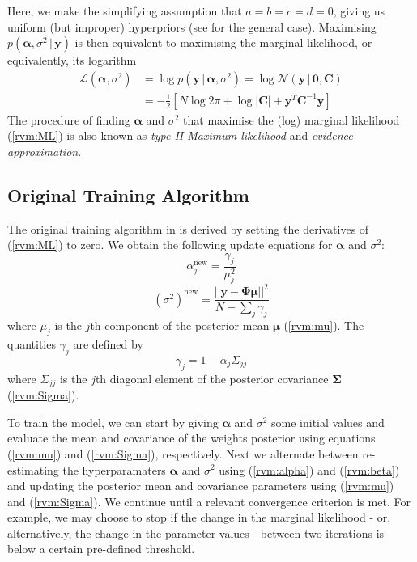 Here, we make the simplifying assumption that $a=b=c=d=0$, giving us uniform (but improper) hyperpriors (see \cite{tipping2001} for the general case).
Maximising $p(\bm\alpha,\sigma^2\,|\,\bm y)$ is then equivalent to maximising the marginal likelihood, or equivalently, its logarithm
\begin{equation}
  \label{rvm:ML}
  \begin{split}
    \mathcal{L}(\bm\alpha,\sigma^2) &= \log p(\bm y\,|\,\bm\alpha,\sigma^2) = \log \mathcal{N}(\bm y \,|\,\bm 0, \bm C)\\
    &=-\frac{1}{2}\left[N\log 2\pi + \log|\bm C| + \bm y^T\bm C^{-1} \bm y\right]
\end{split}    
\end{equation}
The procedure of finding $\bm\alpha$ and $\sigma^2$ that maximise the (log) marginal likelihood (\ref{rvm:ML}) is also known as \emph{type-II Maximum likelihood} and \emph{evidence approximation}.

\subsection{Original Training Algorithm}
The original training algorithm in \cite{tipping2001} is derived by setting the derivatives of (\ref{rvm:ML}) to zero.
We obtain the following update equations for $\bm\alpha$ and $\sigma^2$:
\begin{equation}
  \label{rvm:alpha}
  \alpha_j^{\mbox{new}} = \frac{\gamma_j}{\mu_j^2}
\end{equation}
\begin{equation}
  \label{rvm:beta}
  (\sigma^2)^{\mbox{new}} = \frac{||\bm y - \bm\Phi\bm\mu||^2}{N - \sum_j\gamma_j}
\end{equation}
where $\mu_j$ is the $j$th component of the posterior mean $\bm\mu$ (\ref{rvm:mu}).
The quantities $\gamma_j$ are defined by 
\begin{equation*}
  \gamma_j = 1 - \alpha_j \Sigma_{jj}
\end{equation*}
where $\Sigma_{jj}$ is the $j$th diagonal element of the posterior covariance $\bm\Sigma$ (\ref{rvm:Sigma}).

To train the model, we can start by giving $\bm\alpha$ and $\sigma^2$ some initial values and evaluate the mean and covariance of the weights posterior using equations (\ref{rvm:mu}) and (\ref{rvm:Sigma}), respectively.
Next we alternate between re-estimating the hyperparamaters $\bm\alpha$ and $\sigma^2$ using (\ref{rvm:alpha}) and (\ref{rvm:beta}) and updating the posterior mean and covariance parameters using (\ref{rvm:mu}) and (\ref{rvm:Sigma}).
We continue until a relevant convergence criterion is met.
For example, we may choose to stop if the change in the marginal likelihood - or, alternatively, the change in the parameter values - between two iterations is below a certain pre-defined threshold.

